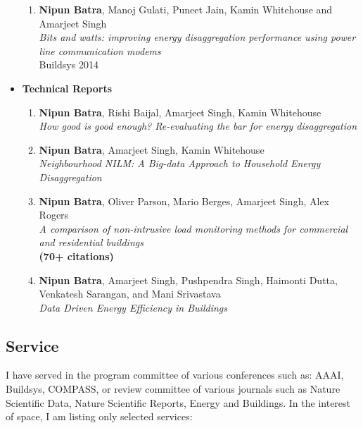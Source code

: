 \documentclass[letter,10pt]{article}
\begin{document}
\begin{itemize}
\begin{enumerate}
\item {\textbf{Nipun Batra}, Manoj Gulati, Puneet Jain, Kamin Whitehouse and Amarjeet Singh} \\ 
\textit{Bits and watts: improving
	energy disaggregation performance using power line communication modems} \\
{Buildsys 2014}


\end{enumerate}

\item[]\textbf{Technical Reports}
    \begin{enumerate}
    \item 
    {\textbf{Nipun Batra}, Rishi Baijal, Amarjeet Singh, Kamin Whitehouse}\\
    \textit{How good is good enough? Re-evaluating
	the bar for energy disaggregation}

\item {\textbf{Nipun Batra},  Amarjeet Singh, Kamin Whitehouse} \\ 
\textit{Neighbourhood NILM: A Big-data Approach to Household
	Energy Disaggregation}

\item {\textbf{Nipun Batra},  Oliver Parson, Mario Berges, Amarjeet Singh, Alex Rogers} \\ 
\textit{A comparison of non-intrusive load monitoring methods for commercial and residential buildings} \\ 
{\textbf{(70+ citations)}}

\item {\textbf{Nipun Batra},  Amarjeet Singh, Pushpendra Singh, Haimonti Dutta, Venkatesh Sarangan, and Mani Srivastava} \\
\textit{Data Driven Energy Efficiency in Buildings}
    
    \end{enumerate}
    
    
    
\end{itemize}


\subsection*{\sc \textbf{Service}\hspace{5pt}\noindent\hrulefill}
I have served in the program committee of various conferences such as: AAAI, Buildsys, COMPASS, or review committee of various journals such as Nature Scientific Data, Nature Scientific Reports, Energy and Buildings. In the interest of space, I am listing only selected services:
\end{document}
